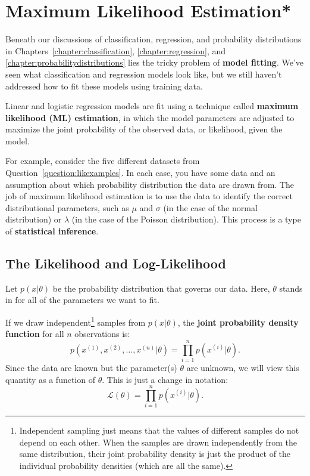 \chapter{Maximum Likelihood Estimation* \label{chapter:mlebasics}}

Beneath our discussions of classification, regression, and probability distributions in Chapters~\ref{chapter:classification}, \ref{chapter:regression}, and \ref{chapter:probabilitydistributions} lies the tricky problem of \textbf{model fitting}. We've seen what classification and regression models look like, but we still haven't addressed how to fit these models using training data.

Linear and logistic regression models are fit using a technique called \textbf{maximum likelihood (ML) estimation}, in which the model parameters are adjusted to maximize the joint probability of the observed data, or likelihood, given the model. 

For example, consider the five different datasets from Question~\ref{question:likexamples}. In each case, you have some data and an assumption about which probability distribution the data are drawn from. The job of maximum likelihood estimation is to use the data to identify the correct distributional parameters, such as $\mu$ and $\sigma$ (in the case of the normal distribution) or $\lambda$ (in the case of the Poisson distribution). This process is a type of \textbf{statistical inference}. 

\section{The Likelihood and Log-Likelihood}

Let $p(x|\theta)$ be the probability distribution that governs our data. Here, $\theta$ stands in for all of the parameters we want to fit. 

If we draw independent\footnote{Independent sampling just means that the values of different samples do not depend on each other. When the samples are drawn independently from the same distribution, their joint probability density is just the product of the individual probability densities (which are all the same).} samples from $p(x|\theta)$, the {\bf joint probability density function} for all $n$ observations is:
$$ p(x^{(1)}, x^{(2)}, \dots, x^{(n)}|\theta) = \prod_{i=1}^n p(x^{(i)}|\theta). $$
Since the data are known but the parameter(s) $\theta$ are unknown, we will view this quantity as a function of $\theta$. This is just a change in notation:
$$ \mathcal{L}(\theta) = \prod_{i=1}^n p(x^{(i)}|\theta). $$

